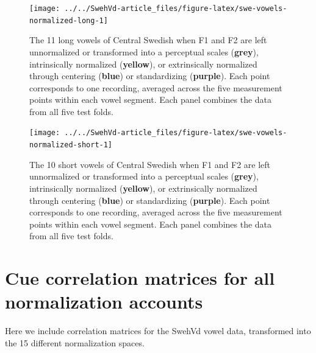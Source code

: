\documentclass[utf8]{frontiers_suppmat} %
\begin{document}
\begin{landscape}
\begin{figure}

{\centering \texttt{[image: ../../SwehVd-article\_files/figure-latex/swe-vowels-normalized-long-1]} 

}

\caption{The 11 long vowels of Central Swedish when F1 and F2 are left unnormalized or transformed into a perceptual scales (\textbf{grey}), intrinsically normalized (\textbf{yellow}), or extrinsically normalized through centering (\textbf{blue}) or standardizing (\textbf{purple}). Each point corresponds to one recording, averaged across the five measurement points within each vowel segment. Each panel combines the data from all five test folds.}\label{fig:swe-vowels-normalized-long}
\end{figure}

\end{landscape}

\begin{landscape}

\begin{figure}

{\centering \texttt{[image: ../../SwehVd-article\_files/figure-latex/swe-vowels-normalized-short-1]} 

}

\caption{The 10 short vowels of Central Swedish when F1 and F2 are left unnormalized or transformed into a perceptual scales (\textbf{grey}), intrinsically normalized (\textbf{yellow}), or extrinsically normalized through centering (\textbf{blue}) or standardizing (\textbf{purple}). Each point corresponds to one recording, averaged across the five measurement points within each vowel segment. Each panel combines the data from all five test folds.}\label{fig:swe-vowels-normalized-short}
\end{figure}

\end{landscape}

\hypertarget{sec:correlation-matrices}{%
\section{Cue correlation matrices for all normalization accounts}\label{sec:correlation-matrices}}

Here we include correlation matrices for the SwehVd vowel data, transformed into the 15 different normalization spaces.

\newpage
\end{document}
